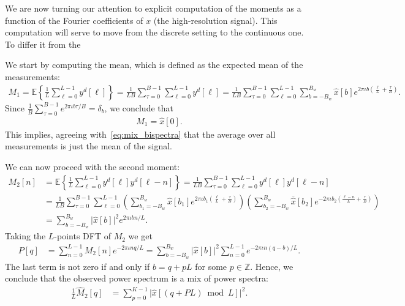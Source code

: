 \documentclass[english,12pt]{article}
\newcommand{\I}{\iota}
\newcommand{\tB}{B_w}
\newcommand{\hx}{\hat{x}}
\newcommand{\E}{\mathbb{E}}
\numberwithin{equation}{section}
\numberwithin{mytheorem}{section} %
\begin{document}
We are now turning our attention to explicit computation of the moments as a function of the Fourier coefficients of $x$ (the high-resolution signal). This computation will serve to move from the discrete setting to the continuous one. To differ it from the  

We start by computing the mean, which is defined as the expected mean of the measurements: 
\begin{equation}
\begin{split}
M_1 = \E\left\{ \frac{1}{L} \sum_{\ell=0}^{L-1} y^d[\ell]\right\} =  \frac{1}{LB}\sum_{\tau=0}^{B-1}\sum_{\ell=0}^{L-1} y^d[\ell] =  \frac{1}{LB}\sum_{\tau=0}^{B-1}\sum_{\ell=0}^{L-1}
\sum_{b=-\tB}^{\tB}\hat{x}[b]e^{2\pi\I b \left(\frac{\ell}{L} + \frac{\tau}{B}\right) }.
\end{split}
\end{equation}
Since $\frac{1}{B}\sum_{\tau=0}^{B-1}e^{2\pi\I b \tau/B}=\delta_b$, we conclude that 
\begin{equation} \label{eq:mean}
\begin{split}
M_1 = \hx[0].
\end{split}
\end{equation}
This  implies, agreeing with~\eqref{eq:mix_bispectra} that the average over all measurements is just the mean of the signal.  

We can now proceed with the second moment:
\begin{equation} \label{eq:ps}
\begin{split}
M_2[n] &= \E\left\{\frac{1}{L}\sum_{\ell=0}^{L-1} y^d[\ell]y^d[\ell-n]\right\} =  \frac{1}{LB}\sum_{\tau=0}^{B-1}\sum_{\ell=0}^{L-1} y^d[\ell]y^d[\ell-n] \\ &=  \frac{1}{LB}\sum_{\tau=0}^{B-1}\sum_{\ell=0}^{L-1}
\left(\sum_{b_1=-\tB}^{\tB}\hat{x}[b_1]e^{2\pi\I b_1 \left(\frac{\ell}{L} + \frac{\tau}{B}\right)} \right)
\left(\sum_{b_2=-\tB}^{\tB}\overline{\hx}[b_2]e^{-2\pi\I b_2 \left(\frac{\ell-n}{L} + \frac{\tau}{B}\right)} \right) \\
&=
\sum_{b=-\tB}^{\tB}\vert \hat{x}[b]\vert ^2e^{2\pi\I bn/L}.
\end{split}
\end{equation}
Taking the $L$-points DFT of $M_2$ we get 
\begin{equation}
\begin{split}
P[q] &= \sum_{n=0}^{L-1}M_2[n]e^{-2\pi\I nq/L} = \sum_{b=-\tB}^{\tB}\vert \hat{x}[b]\vert^2\sum_{n=0}^{L-1}e^{-2\pi\I n(q-b)/L}.
\end{split}
\end{equation}
The last term is not zero if and only if $b = q + pL$ for some $p\in\mathbb{Z}$.  Hence, we conclude that the observed power spectrum is a mix of power spectra:
\begin{equation}
\begin{split}
\frac{1}{L}\hat{M}_2[q] &=  \sum_{p=0}^{K-1} \vert \hat{x}[(q+PL)\bmod L]\vert^2.
\end{split}
\end{equation}
\end{document}
